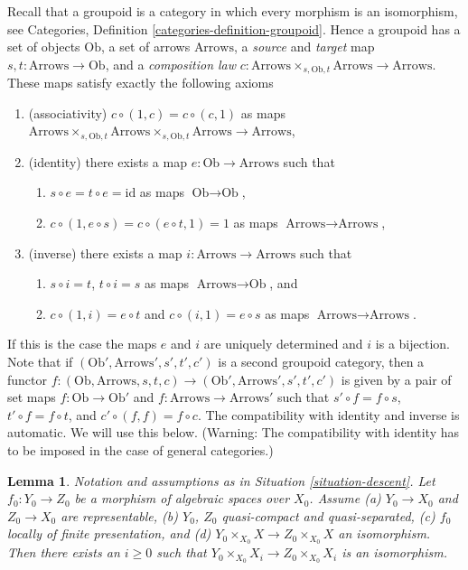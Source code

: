 \documentclass{amsart}
\theoremstyle{plain}
\newtheorem{lemma}[subsection]{Lemma}
\theoremstyle{definition}
\theoremstyle{remark}
\numberwithin{equation}{subsection}
\begin{document}
\noindent
Recall that a groupoid is a category in which every morphism
is an isomorphism, see
Categories, Definition \ref{categories-definition-groupoid}.
Hence a groupoid has a set of objects $\text{Ob}$,
a set of arrows $\text{Arrows}$, a {\it source} and {\it target}
map $s, t : \text{Arrows} \to \text{Ob}$, and a {\it composition law}
$c : \text{Arrows} \times_{s, \text{Ob}, t} \text{Arrows}
\to \text{Arrows}$.
These maps satisfy exactly the following axioms
\begin{enumerate}
\item (associativity) $c \circ (1, c) = c \circ (c, 1)$ as maps
$\text{Arrows} \times_{s, \text{Ob}, t}
\text{Arrows} \times_{s, \text{Ob}, t}
\text{Arrows} \to \text{Arrows}$,
\item (identity) there exists a map $e : \text{Ob} \to \text{Arrows}$
such that
\begin{enumerate}
\item $s \circ e = t \circ e = \text{id}$ as maps $\text{Ob} \to \text{Ob}$,
\item $c \circ (1, e \circ s) = c \circ (e \circ t, 1) = 1$
as maps $\text{Arrows} \to \text{Arrows}$,
\end{enumerate}
\item (inverse) there exists a map $i : \text{Arrows} \to \text{Arrows}$
such that
\begin{enumerate}
\item $s \circ i = t$, $t \circ i = s$ as maps $\text{Arrows} \to \text{Ob}$,
and
\item $c \circ (1, i) = e \circ t$ and $c \circ (i, 1) = e \circ s$
as maps $\text{Arrows} \to \text{Arrows}$.
\end{enumerate}
\end{enumerate}
If this is the case the maps $e$ and $i$ are uniquely determined and
$i$ is a bijection. Note that if $(\text{Ob}', \text{Arrows}', s', t', c')$
is a second groupoid category, then a functor
$f : (\text{Ob}, \text{Arrows}, s, t, c) \to
(\text{Ob}', \text{Arrows}', s', t', c')$
is given by a pair of set maps $f : \text{Ob} \to \text{Ob}'$ and
$f : \text{Arrows} \to \text{Arrows}'$ such that
$s' \circ f = f \circ s$, $t' \circ f = f \circ t$, and
$c' \circ (f, f) = f \circ c$. The compatibility with identity and
inverse is automatic. We will use this below.
(Warning: The compatibility with identity
has to be imposed in the case of general categories.)


\begin{lemma}
\label{lemma-descend-equality}
Notation and assumptions as in Situation \ref{situation-descent}.
Let $f_0 : Y_0 \to Z_0$ be a morphism of algebraic spaces over $X_0$.
Assume (a) $Y_0 \to X_0$ and $Z_0 \to X_0$ are representable, (b)
$Y_0$, $Z_0$ quasi-compact and quasi-separated, (c)
$f_0$ locally of finite presentation, and
(d) $Y_0 \times_{X_0} X \to Z_0 \times_{X_0} X$ an isomorphism.
Then there exists an $i \geq 0$ such that
$Y_0 \times_{X_0} X_i \to Z_0 \times_{X_0} X_i$ is an isomorphism.
\end{lemma}
\end{document}
